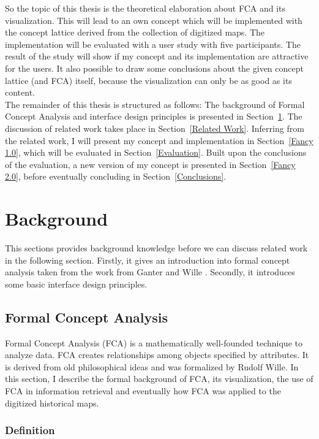 \documentclass[11pt]{report}
\begin{document}
So the topic of this thesis is the theoretical elaboration about FCA and its visualization. This will lead to an own concept which will be implemented with the concept lattice derived from the collection of digitized maps. The implementation will be evaluated with a user study with five participants. The result of the study will show if my concept and its implementation are attractive for the users. It also possible to draw some conclusions about the given concept lattice (and FCA) itself, because the visualization can only be as good as its content.\\

 The remainder of this thesis is structured as follows: The background of Formal Concept Analysis and interface design principles is presented in Section~\ref{Background}. The discussion of related work takes place in Section~\ref{Related Work}. Inferring from the related work, I will present my concept  and implementation in Section~\ref{Fancy 1.0}, which will  be evaluated in Section~\ref{Evaluation}. Built upon the conclusions of the evaluation, a new version of my concept is presented in Section~\ref{Fancy 2.0}, before eventually concluding in Section~\ref{Conclusions}.
 
\chapter{Background}
\label{Background}

This sections provides background knowledge before we can discuss related work in the following section. Firstly, it gives an introduction into formal concept analysis taken from the work from Ganter and Wille \cite{Ganter2012}. Secondly, it introduces some basic interface design principles.

\section{Formal Concept Analysis}
\label{Formal Concept Analysis}

Formal Concept Analysis (FCA) is a mathematically well-founded technique to analyze data. FCA creates relationships among objects specified by attributes. It is derived from old philosophical ideas and was formalized by Rudolf Wille. In this section, I describe the formal background of FCA, its visualization, the use of FCA in information retrieval and eventually how FCA was applied to the digitized historical maps.

\subsection{Definition}
\end{document}
